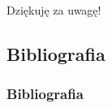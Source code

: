 \documentclass{beamer}
\begin{document}

\begin{frame}
\Huge{\centerline{Dziękuję za uwagę!}}
\end{frame}


\subsection{Bibliografia}

\begin{frame}[allowframebreaks]
\frametitle{Bibliografia}

\end{frame}

\end{document}
